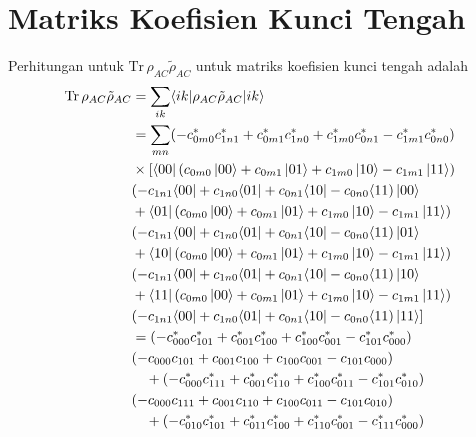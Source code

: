 \chapter{Matriks Koefisien Kunci Tengah}
Perhitungan untuk $\mathrm{Tr}\,\rho_{AC} \tilde{\rho}_{AC}$ untuk matriks koefisien kunci tengah adalah
\begin{equation}
	\begin{aligned}
		\mathrm{Tr}\,\rho_{AC} \tilde{\rho}_{AC}
		&= \sum_{i k}
		\langle i k |
		\rho_{AC} \tilde{\rho}_{AC}
		| i k \rangle \\
		&= \sum_{m n}
		(- c^{*}_{0m0} c^{*}_{1n1}
		+ c^{*}_{0m1} c^{*}_{1n0}
		+ c^{*}_{1m0} c^{*}_{0n1}
		- c^{*}_{1m1} c^{*}_{0n0})\\
		&\times[\bra{00}(c_{0m0} \ket{00}
		+ c_{0m1} \ket{01}
		+ c_{1m0} \ket{10}
		- c_{1m1} \ket{11})\\
		&(- c_{1n1} \langle 00|
		+ c_{1n0} \langle 01|
		+ c_{0n1} \langle 10|
		- c_{0n0} \langle 11)\ket{00}\\
		&+\bra{01}(c_{0m0} \ket{00}
		+ c_{0m1} \ket{01}
		+ c_{1m0} \ket{10}
		- c_{1m1} \ket{11})\\
		&(- c_{1n1} \langle 00|
		+ c_{1n0} \langle 01|
		+ c_{0n1} \langle 10|
		- c_{0n0} \langle 11)\ket{01}\\
		&+\bra{10}(c_{0m0} \ket{00}
		+ c_{0m1} \ket{01}
		+ c_{1m0} \ket{10}
		- c_{1m1} \ket{11})\\
		&(- c_{1n1} \langle 00|
		+ c_{1n0} \langle 01|
		+ c_{0n1} \langle 10|
		- c_{0n0} \langle 11)\ket{10}\\
		&+\bra{11}(c_{0m0} \ket{00}
		+ c_{0m1} \ket{01}
		+ c_{1m0} \ket{10}
		- c_{1m1} \ket{11})\\
		&(- c_{1n1} \langle 00|
		+ c_{1n0} \langle 01|
		+ c_{0n1} \langle 10|
		- c_{0n0} \langle 11)\ket{11}]\\
		&= (-c^{*}_{000} c^{*}_{101}
		+ c^{*}_{001} c^{*}_{100}
		+ c^{*}_{100} c^{*}_{001}
		- c^{*}_{101} c^{*}_{000})\\
		&(-c_{000} c_{101}
		+ c_{001} c_{100}
		+ c_{100} c_{001}
		- c_{101} c_{000}) \\
		&\quad + (-c^{*}_{000} c^{*}_{111}
		+ c^{*}_{001} c^{*}_{110}
		+ c^{*}_{100} c^{*}_{011}
		- c^{*}_{101} c^{*}_{010})\\
		&(-c_{000} c_{111}
		+ c_{001} c_{110}
		+ c_{100} c_{011}
		- c_{101} c_{010}) \\
		&\quad + (-c^{*}_{010} c^{*}_{101}
		+ c^{*}_{011} c^{*}_{100}
		+ c^{*}_{110} c^{*}_{001}
		- c^{*}_{111} c^{*}_{000})\\

\end{aligned}
\end{equation}
